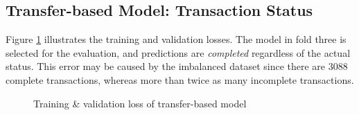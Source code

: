 \documentclass[12pt,twoside]{report}
\begin{document}
\subsection{Transfer-based Model: Transaction Status}
Figure \ref{transfer_based_status} illustrates the training and validation losses. The model in fold three is selected for the evaluation, and predictions are \textit{completed} regardless of the actual status. This error may be caused by the imbalanced dataset since there are 3088 complete transactions, whereas more than twice as many incomplete transactions. 

\begin{figure}[!htbp]
	\centering
	\hfill
	\hfill
	\hfil
	\hfil
	\caption{Training \& validation loss of transfer-based model}
	\label{transfer_based_status}
\end{figure}
\end{document}
